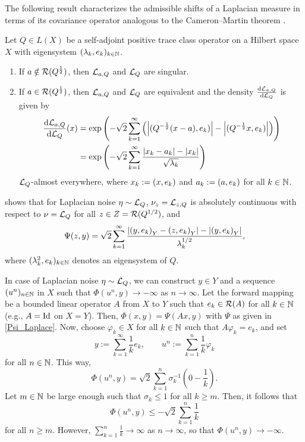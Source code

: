 \documentclass[english]{jnsao}
\theoremstyle{definition}
\begin{document}
The following result characterizes the admissible shifts of a Laplacian measure in terms of its covariance operator analogous to the Cameron--Martin theorem \cite[Thm.~2.3.1]{DaPrato:2001}.
\begin{theorem}
	\label{thmLaplaceAlt}
	Let $Q \in L(X)$ be a self-adjoint positive trace class operator on a Hilbert space $X$ with eigensystem $(\lambda_k, e_k)_{k\in\mathbb{N}}$.
	\begin{enumerate}
		\item If $a \notin \operatorname{\mathcal{R}}(Q^\frac12)$, then $\mathcal{L}_{a,Q}$ and $\mathcal{L}_Q$ are singular.
		\item If $a \in \operatorname{\mathcal{R}}(Q^\frac12)$, then $\mathcal{L}_{a,Q}$ and $\mathcal{L}_Q$ are equivalent and the density $\frac{\mathrm{d}\mathcal{L}_{a,Q}}{\mathrm{d}\mathcal{L}_Q}$ is given by
		\begin{align*}
			\frac{\mathrm{d}\mathcal{L}_{a,Q}}{\mathrm{d}\mathcal{L}_Q}(x) 
			&= \exp\left( -\sqrt{2} \sum_{k=1}^\infty \left(\left|{(Q^{-\frac12}(x - a), e_k)}\right| - \left|{(Q^{-\frac12}x, e_k)}\right|\right) \right) \\
			&= \exp\left( -\sqrt{2}\sum_{k=1}^\infty \frac{ \left|x_k - a_k\right| - \left|x_k\right| }{ \sqrt{\lambda_k} } \right)
		\end{align*}
	$\mathcal{L}_Q$-almost everywhere, where $x_k := {(x,e_k)}$ and $a_k := {(a,e_k)}$ for all $k \in \mathbb{N}$.
	\end{enumerate}
\end{theorem}
 shows that for Laplacian noise $\eta \sim \mathcal{L}_Q$, $\nu_z = \mathcal{L}_{z,Q}$ is absolutely continuous with respect to $\nu = \mathcal{L}_Q$ for all $z \in Z = \operatorname{\mathcal{R}}(Q^{1/2})$, and
\begin{equation}
	\label{Psi_Laplace}
	\Psi(z,y) = \sqrt{2} \sum_{k=1}^\infty \frac{{\lvert{(y,e_k)}_Y - {(z,e_k)}_Y\rvert} - {\lvert{(y,e_k)}_Y\rvert}}{\lambda_k^{1/2}},
\end{equation}
where $(\lambda_k^2, e_k)_{k\in\mathbb{N}}$ denotes an eigensystem of $Q$.

\begin{example}
	\label{ex:unbounded_phi}
	In case of Laplacian noise $\eta \sim \mathcal{L}_Q$, we can construct $y \in Y$ and a sequence $(u^n)_{n \in \mathbb{N}}$ in $X$ such that $\Phi(u^n,y) \to -\infty$ as $n \to \infty$.
	Let the forward mapping be a bounded linear operator $A$ from $X$ to $Y$ such that $e_k \in \operatorname{\mathcal{R}}(A)$ for all $k \in \mathbb{N}$ (e.g., $A = \operatorname{Id}$ on $X = Y$). Then, $\Phi(x,y) = \Psi(Ax,y)$ with $\Psi$ as given in \eqref{Psi_Laplace}.
	Now, choose $\varphi_k \in X$ for all $k \in \mathbb{N}$ such that $A\varphi_k = e_k$, and set
	\[ y := \sum_{k=1}^\infty \frac{1}{k}e_k, \qquad u^n := \sum_{k=1}^n \frac{1}{k}\varphi_k \]
	for all $n \in \mathbb{N}$. This way,
	\[ \Phi(u^n,y) = \sqrt{2} \sum_{k=1}^n \sigma_k^{-1} \left(0 - \frac{1}{k}\right). \]
	Let $m \in \mathbb{N}$ be large enough such that $\sigma_k \le 1$ for all $k \ge m$. Then, it follows that
	\[ \Phi(u^n,y) \le -\sqrt{2} \sum_{k=1}^n \frac{1}{k} \]
	for all $n \ge m$. However, $\sum_{k=1}^n \frac{1}{k} \to \infty$ as $n \to \infty$, so that $\Phi(u^n,y) \to -\infty$.
\end{example}
\end{document}
